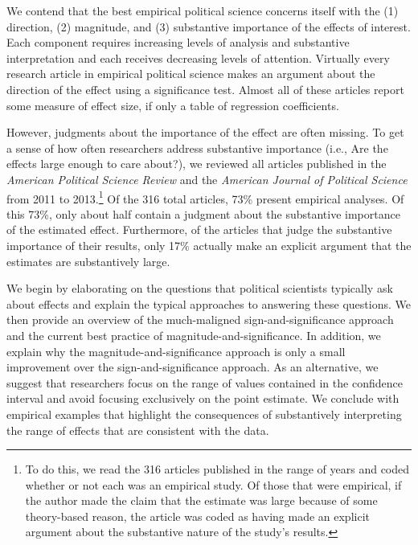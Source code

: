 \documentclass[12pt]{article}
\begin{document}
We contend that the best empirical political science concerns itself with the (1) direction, (2) magnitude, and (3) substantive importance of the effects of interest. Each component requires increasing levels of analysis and substantive interpretation and each receives decreasing levels of attention. Virtually every research article in empirical political science makes an argument about the direction of the effect using a significance test. Almost all of these articles report some measure of effect size, if only a table of regression coefficients. 

However, judgments about the importance of the effect are often missing. To get a sense of how often researchers address substantive importance (i.e., Are the effects large enough to care about?), we reviewed all articles published in the \textit{American Political Science Review} and the \textit{American Journal of Political Science} from 2011 to 2013.\footnote{To do this, we read the 316 articles published in the range of years and coded whether or not each was an empirical study. Of those that were empirical, if the author made the claim that the estimate was large because of some theory-based reason, the article was coded as having made an explicit argument about the substantive nature of the study's results.}  Of the 316 total articles, 73\% present empirical analyses. Of this 73\%, only about half contain a judgment about the substantive importance of the estimated effect. Furthermore, of the articles that judge the substantive importance of their results, only 17\% actually make an explicit argument that the estimates are substantively large.

We begin by elaborating on the questions that political scientists typically ask about effects and explain the typical approaches to answering these questions. We then provide an overview of the much-maligned sign-and-significance approach and the current best practice of magnitude-and-significance. In addition, we explain why the magnitude-and-significance approach is only a small improvement over the sign-and-significance approach. As an alternative, we suggest that researchers focus on the range of values contained in the confidence interval and avoid focusing exclusively on the point estimate. We conclude with empirical examples that highlight the consequences of substantively interpreting the range of effects that are consistent with the data.
\end{document}
